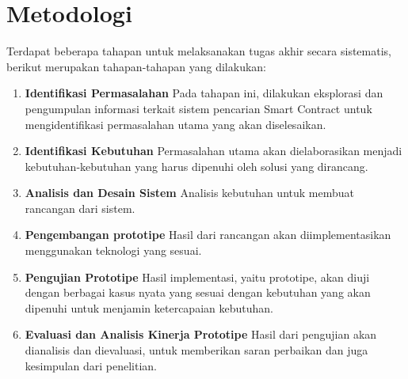 \section{Metodologi}
\label{sec:metodologi}


Terdapat beberapa tahapan untuk melaksanakan tugas akhir secara sistematis, berikut merupakan tahapan-tahapan yang dilakukan:

\begin{enumerate}
	\item \textbf{Identifikasi Permasalahan} \newline
	      Pada tahapan ini, dilakukan eksplorasi dan pengumpulan informasi terkait sistem pencarian Smart Contract untuk mengidentifikasi permasalahan utama yang akan diselesaikan.
	\item \textbf{Identifikasi Kebutuhan} \newline
	      Permasalahan utama akan dielaborasikan menjadi kebutuhan-kebutuhan yang harus dipenuhi oleh solusi yang dirancang.
	\item \textbf{Analisis dan Desain Sistem} \newline
	      Analisis kebutuhan untuk membuat rancangan dari sistem.
	\item \textbf{Pengembangan prototipe} \newline
	      Hasil dari rancangan akan diimplementasikan menggunakan teknologi yang sesuai.
	\item \textbf{Pengujian Prototipe} \newline
	      Hasil implementasi, yaitu prototipe, akan diuji dengan berbagai kasus nyata yang sesuai dengan kebutuhan yang akan dipenuhi untuk menjamin ketercapaian kebutuhan.
	\item \textbf{Evaluasi dan Analisis Kinerja Prototipe} \newline
	      Hasil dari pengujian akan dianalisis dan dievaluasi, untuk memberikan saran perbaikan dan juga kesimpulan dari penelitian.
\end{enumerate}



